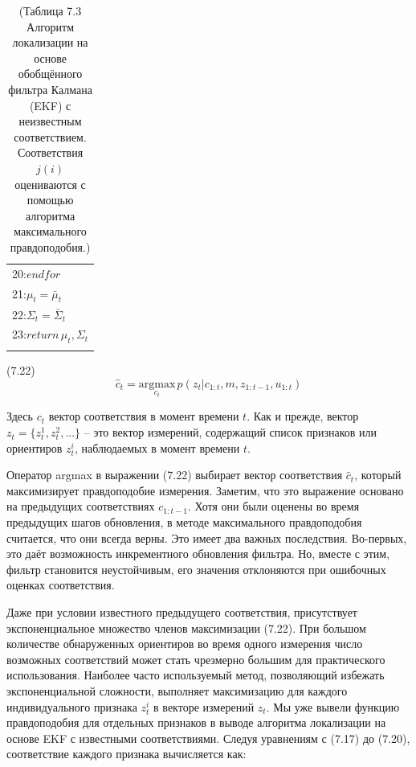 \documentclass[10pt,a4paper]{article}
\begin{document}
\begin{table}[H]
\begin{center}
\begin{tabular}{|l|}
20:\hspace{4mm}$\textit{endfor}$\\
21:\hspace{4mm}$\mu_t=\bar{\mu}_t$\\
22:\hspace{4mm}$\varSigma_t=\bar{\varSigma}_t$\\
23:\hspace{4mm}$\textit{return}\,\mu_t,\varSigma_t$\\
{}\\
\hline
\end{tabular}
\caption{(Таблица 7.3 Алгоритм локализации на основе обобщённого фильтра Калмана (EKF) с неизвестным соответствием. Соответствия $j(i)$ оцениваются с помощью алгоритма максимального правдоподобия.)}
\end{center}
\end{table}

(7.22) 
$$\hat{c}_t=\underset{c_t}{\text{argmax}}\,p(z_t|c_{1:t},m,z_{1:t-1},u_{1:t})$$

Здесь $c_t$ вектор соответствия в момент времени $t$. Как и прежде, вектор $z_t = \{z_t^1, z_t^2, . . .\}$ – это вектор измерений, содержащий список признаков или ориентиров $z_t^i$, наблюдаемых в момент времени $t$.

Оператор argmax в выражении (7.22) выбирает вектор соответствия $\hat{c}_t$, который максимизирует правдоподобие измерения. Заметим, что это выражение основано на предыдущих соответствиях $c_{1:t-1}$. Хотя они были оценены во время предыдущих шагов обновления, в методе максимального правдоподобия считается, что они всегда верны. Это имеет два важных последствия. Во-первых, это даёт возможность инкрементного обновления фильтра. Но, вместе с этим, фильтр становится неустойчивым, его значения отклоняются при ошибочных оценках соответствия. 
 
Даже при условии известного предыдущего соответствия, присутствует экспоненциальное множество членов максимизации (7.22). При большом количестве обнаруженных ориентиров во время одного измерения число возможных соответствий может стать чрезмерно большим для практического использования. Наиболее часто используемый метод, позволяющий избежать экспоненциальной сложности, выполняет максимизацию для каждого индивидуального признака $z_t^i$ в векторе измерений $z_t$. Мы уже вывели функцию правдоподобия для отдельных признаков в выводе алгоритма локализации на основе EKF с известными соответствиями. Следуя уравнениям с (7.17) до (7.20), соответствие каждого признака вычисляется как:\\
\end{document}
